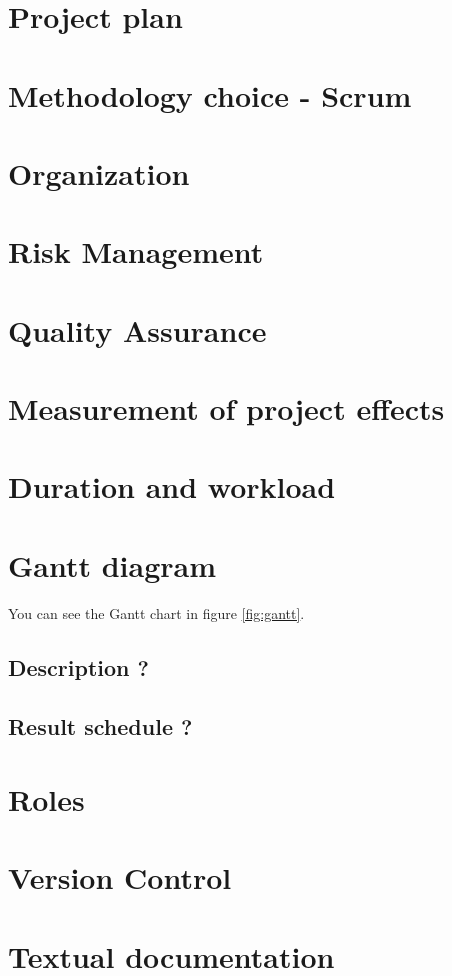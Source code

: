\section{Project plan}
\section{Methodology choice - Scrum}
\section{Organization}
\section{Risk Management}
\section{Quality Assurance}
\section{Measurement of project effects}
\section{Duration and workload}
\section{Gantt diagram}
You can see the Gantt chart in figure \ref{fig:gantt}.

\subsection{Description ?}
\subsection{Result schedule ?}
\section{Roles}
\section{Version Control}
\section{Textual documentation}
